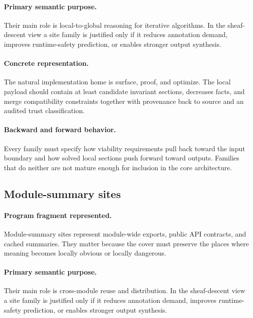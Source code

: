 \documentclass[11pt]{report}
\theoremstyle{definition}
\theoremstyle{plain}
\begin{document}
\paragraph{Primary semantic purpose.}
Their main role is local-to-global reasoning for iterative algorithms. In the sheaf-descent view a site family is
justified only if it reduces annotation demand, improves runtime-safety
prediction, or enables stronger output synthesis.

\paragraph{Concrete representation.}
The natural implementation home is surface, proof, and optimize. The local payload should contain
at least candidate invariant sections, decreases facts, and merge compatibility constraints together with provenance back to source and an audited
trust classification.

\paragraph{Backward and forward behavior.}
Every family must specify how viability requirements pull back toward the
input boundary and how solved local sections push forward toward outputs.
Families that do neither are not mature enough for inclusion in the core
architecture.

\subsection{Module-summary sites}

\paragraph{Program fragment represented.}
Module-summary sites represent module-wide exports, public API contracts, and cached summaries. They matter because the cover must preserve the
places where meaning becomes locally obvious or locally dangerous.

\paragraph{Primary semantic purpose.}
Their main role is cross-module reuse and distribution. In the sheaf-descent view a site family is
justified only if it reduces annotation demand, improves runtime-safety
prediction, or enables stronger output synthesis.
\end{document}
